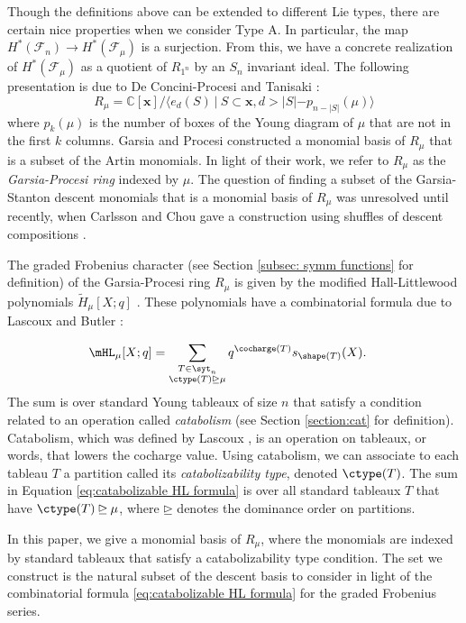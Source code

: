 Though the definitions above can be extended to different Lie types, there are certain nice properties when we consider Type A. In particular, the map $H^*(\mathcal{F}_n) \to H^*(\mathcal{F}_\mu)$ is a surjection. 
From this, we have a concrete realization of $H^*(\mathcal{F}_\mu)$ as a quotient of $R_{1^n}$ by an $S_n$ invariant ideal. The following presentation is due to De Concini-Procesi \cite{deCon-Proc} and Tanisaki \cite{Tanisaki}:
\[R_\mu = \mathbb{C}[\mathbf{x}]/\langle e_d(S) \ | \ S\subset \mathbf{x}, d> |S| -p_{n-|S|}(\mu) \rangle\]
where $p_{k}(\mu)$ is the number of boxes of the Young diagram of $\mu$ that are not in the first $k$ columns.
Garsia and Procesi \cite{GP} constructed a monomial basis of $R_\mu$ that is a subset of the Artin monomials.
In light of their work, we refer to $R_\mu$ as the \textit{Garsia-Procesi ring} indexed by $\mu$. 
The question of finding a subset of the Garsia-Stanton descent monomials that is a monomial basis of $R_\mu$ was unresolved until recently, when Carlsson and Chou gave a construction using shuffles of descent compositions  \cite{CC}. 

The graded Frobenius character (see Section \ref{subsec: symm functions} for definition) of the Garsia-Procesi ring $R_\mu$ is given by the modified Hall-Littlewood polynomials 
$\tilde{H}_\mu[X;q]$ \cite{HottaSpringer}. These polynomials have a combinatorial formula due to  
Lascoux \cite{Lascoux} and Butler \cite{butler}:

\begin{align}\label{eq:catabolizable HL formula}
        \mHL_\mu[X;q] &=  \sum\limits_{\substack{T\in \syt_n\\  \ctype(T)\unrhd\mu}}  q^{\cocharge(T)} s_{\shape(T)}(X).
\end{align}
The sum is over standard Young tableaux of size $n$ that satisfy a condition related to an operation called \textit{catabolism} (see Section \ref{section:cat} for definition). Catabolism, which was defined by Lascoux \cite{Lascoux},  is an operation on tableaux, or words, that lowers the cocharge value. 
Using catabolism, we can associate to each tableau $T$ a partition called its \textit{catabolizability type}, denoted $\ctype(T)$.
The sum in Equation \eqref{eq:catabolizable HL formula} is over all standard tableaux $T$ that have $\ctype(T) \unrhd \mu$, where $\unrhd$ denotes the dominance order on partitions.


In this paper, we give a monomial basis of $R_{\mu}$, where the monomials are indexed by standard tableaux that satisfy a catabolizability type condition. 
The set we construct is the natural subset of the descent basis to consider in light of the combinatorial formula \eqref{eq:catabolizable HL formula} for the graded Frobenius series.


